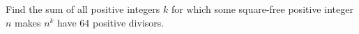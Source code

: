 Find the sum of all positive integers $k$ for which some square-free positive integer $n$ makes $n^k$ have 64 positive divisors.
